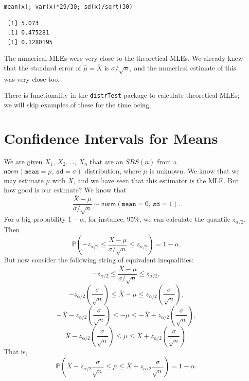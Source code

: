 \documentclass[captions=tableheading]{scrbook}
\begin{document}
\begin{example}
\lstset{language=R}
\begin{lstlisting}
mean(x); var(x)*29/30; sd(x)/sqrt(30)
\end{lstlisting}

\begin{verbatim}
 [1] 5.073
 [1] 0.475281
 [1] 0.1280195
\end{verbatim}

The numerical MLEs were very close to the theoretical MLEs. We already knew that the standard error of \(\hat{\mu}=\overline{X}\) is \(\sigma/\sqrt{n}\), and the numerical estimate of this was very close too.

\end{example}

There is functionality in the \texttt{distrTest} package \cite{Ruckdescheldistr} to calculate theoretical MLEs; we will skip examples of these for the time being.
\section{Confidence Intervals for Means}
\label{sec-9-2}
\label{sec-Confidence-Intervals-for-Means}


We are given \(X_{1}\), \(X_{2}\), \ldots{}, \(X_{n}\) that are an \(SRS(n)\) from a \(\mathsf{norm}(\mathtt{mean}=\mu,\,\mathtt{sd}=\sigma)\) distribution, where \(\mu\) is unknown. We know that we may estimate \(\mu\) with \(\overline{X}\), and we have seen that this estimator is the MLE. But how good is our estimate? We know that 
\begin{equation} 
\frac{\overline{X}-\mu}{\sigma/\sqrt{n}}\sim\mathsf{norm}(\mathtt{mean}=0,\,\mathtt{sd}=1).
\end{equation}
For a big probability \(1-\alpha\), for instance, 95\%, we can calculate the quantile \(z_{\alpha/2}\). Then
\begin{equation}
\mathbb{P}\left(-z_{\alpha/2}\leq\frac{\overline{X}-\mu}{\sigma/\sqrt{n}}\leq z_{\alpha/2}\right)=1-\alpha.
\end{equation}
But now consider the following string of equivalent inequalities:
\[
-z_{\alpha/2}\leq\frac{\overline{X}-\mu}{\sigma/\sqrt{n}}\leq z_{\alpha/2},
\]
\[
-z_{\alpha/2}\left(\frac{\sigma}{\sqrt{n}}\right)\leq\overline{X}-\mu\leq z_{\alpha/2}\left(\frac{\sigma}{\sqrt{n}}\right),
\]
\[
-\overline{X}-z_{\alpha/2}\left(\frac{\sigma}{\sqrt{n}}\right)\leq-\mu\leq-\overline{X}+z_{\alpha/2}\left(\frac{\sigma}{\sqrt{n}}\right),
\]
\[
\overline{X}-z_{\alpha/2}\left(\frac{\sigma}{\sqrt{n}}\right)\leq\mu\leq\overline{X}+z_{\alpha/2}\left(\frac{\sigma}{\sqrt{n}}\right).
\]
That is, 
\begin{equation}
\mathbb{P}\left(\overline{X}-z_{\alpha/2}\frac{\sigma}{\sqrt{n}}\leq\mu\leq\overline{X}+z_{\alpha/2}\frac{\sigma}{\sqrt{n}}\right)=1-\alpha.
\end{equation}
\end{document}
